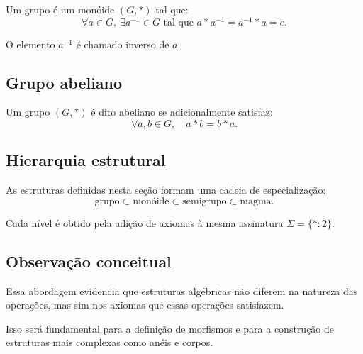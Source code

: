 \documentclass[../../main]{subfiles}
\begin{document}
Um grupo é um monóide $(G,\ast)$ tal que:
\[
	\forall a \in G,\ \exists a^{-1} \in G \text{ tal que } a \ast a^{-1} = a^{-1} \ast a = e.
\]

O elemento $a^{-1}$ é chamado inverso de $a$.

\subsection{Grupo abeliano}

Um grupo $(G,\ast)$ é dito abeliano se adicionalmente satisfaz:
\[
	\forall a,b \in G,\quad a \ast b = b \ast a.
\]

\subsection{Hierarquia estrutural}

As estruturas definidas nesta seção formam uma cadeia de especialização:
\[
	\text{grupo} \subset \text{monóide} \subset \text{semigrupo} \subset \text{magma}.
\]

Cada nível é obtido pela adição de axiomas à mesma assinatura $\Sigma = \{\ast : 2\}$.

\subsection{Observação conceitual}

Essa abordagem evidencia que estruturas algébricas não diferem na natureza das operações, mas sim nos axiomas que essas operações satisfazem.

Isso será fundamental para a definição de morfismos e para a construção de estruturas mais complexas como anéis e corpos.
\end{document}
